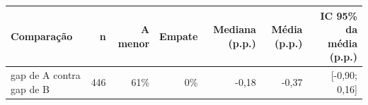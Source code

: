 \begin{tabular}{lrrrrrr}
\toprule
Comparação & n & A menor & Empate & Mediana (p.p.) & Média (p.p.) & IC 95\% da média (p.p.) \\
\midrule
gap de A contra gap de B & 446 & 61\% & 0\% & -0,18 & -0,37 & [-0,90; 0,16] \\
\bottomrule
\end{tabular}
